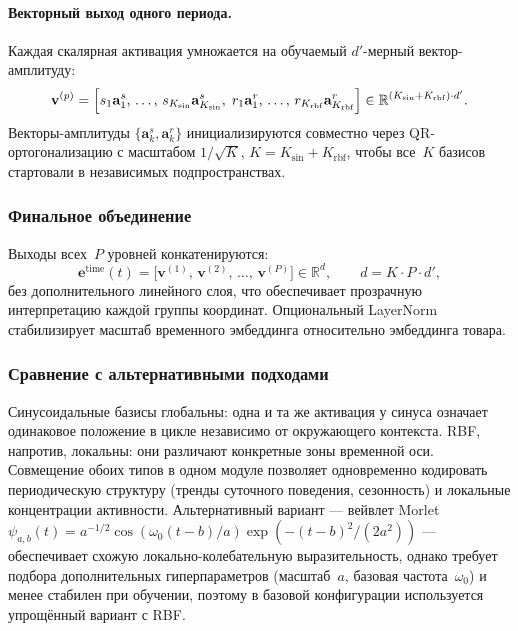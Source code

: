 \paragraph{Векторный выход одного периода.} Каждая скалярная активация умножается на
обучаемый $d'$-мерный вектор-амплитуду:
\begin{equation}
  \mathbf{v}^{(p)}
  = \Bigl[s_1 \mathbf{a}^s_1,\, \ldots,\, s_{K_{\sin}} \mathbf{a}^s_{K_{\sin}},\;
          r_1 \mathbf{a}^r_1,\, \ldots,\, r_{K_{\mathrm{rbf}}} \mathbf{a}^r_{K_{\mathrm{rbf}}}\Bigr]
  \in \mathbb{R}^{(K_{\sin}+K_{\mathrm{rbf}})\cdot d'}.
\end{equation}
Векторы-амплитуды $\{\mathbf{a}^s_k, \mathbf{a}^r_k\}$ инициализируются совместно через
QR-ортогонализацию с масштабом $1/\sqrt{K}$, $K = K_{\sin} + K_{\mathrm{rbf}}$, чтобы все~$K$
базисов стартовали в независимых подпространствах.

\subsubsection{Финальное объединение}

Выходы всех~$P$ уровней конкатенируются:
\begin{equation}
  \mathbf{e}^{\mathrm{time}}(t)
  = \bigl[\mathbf{v}^{(1)},\, \mathbf{v}^{(2)},\, \ldots,\, \mathbf{v}^{(P)}\bigr]
  \in \mathbb{R}^{d},
  \qquad
  d = K \cdot P \cdot d',
\end{equation}
без дополнительного линейного слоя, что обеспечивает прозрачную интерпретацию каждой группы
координат. Опциональный LayerNorm стабилизирует масштаб временного эмбеддинга относительно
эмбеддинга товара.

\subsubsection{Сравнение с альтернативными подходами}

Синусоидальные базисы глобальны: одна и та же активация у синуса означает одинаковое положение в
цикле независимо от окружающего контекста. RBF, напротив, локальны: они различают конкретные зоны
временной оси. Совмещение обоих типов в одном модуле позволяет одновременно кодировать
периодическую структуру (тренды суточного поведения, сезонность) и локальные концентрации активности.
Альтернативный вариант --- вейвлет Morlet
$\psi_{a,b}(t) = a^{-1/2}\cos(\omega_0(t-b)/a)\exp(-(t-b)^2/(2a^2))$
--- обеспечивает схожую локально-колебательную выразительность, однако требует подбора дополнительных
гиперпараметров (масштаб~$a$, базовая частота~$\omega_0$) и менее стабилен при обучении, поэтому
в базовой конфигурации используется упрощённый вариант с RBF.


